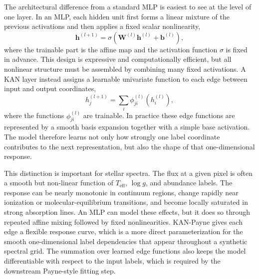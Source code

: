 \documentclass[universe,article,submit,pdftex,moreauthors]{Definitions/mdpi}
\begin{document}
The architectural difference from a standard MLP is easiest to see at the
level of one layer. In an MLP, each hidden unit first forms a linear mixture of
the previous activations and then applies a fixed scalar nonlinearity,
\begin{equation}
    \label{eq:mlp-layer}
    \mathbf{h}^{(l+1)} =
    \sigma\!\left(\mathbf{W}^{(l)}\mathbf{h}^{(l)}+\mathbf{b}^{(l)}\right),
\end{equation}
where the trainable part is the affine map and the activation function
$\sigma$ is fixed in advance. This design is expressive and computationally
efficient, but all nonlinear structure must be assembled by combining many
fixed activations. A KAN layer instead assigns a learnable univariate function
to each edge between input and output coordinates,
\begin{equation}
    \label{eq:kan-layer}
    h^{(l+1)}_j =
    \sum_i \phi^{(l)}_{j i}\!\left(h^{(l)}_i\right),
\end{equation}
where the functions $\phi^{(l)}_{ji}$ are trainable. In practice these edge
functions are represented by a smooth basis expansion together with a simple
base activation. The model therefore learns not only how strongly one label
coordinate contributes to the next representation, but also the shape of that
one-dimensional response.

This distinction is important for stellar spectra. The flux at a given pixel is
often a smooth but non-linear function of $T_{\mathrm{eff}}$, $\log g$, and
abundance labels. The response can be nearly monotonic in continuum regions,
change rapidly near ionization or molecular-equilibrium transitions, and become
locally saturated in strong absorption lines. An MLP can model these effects,
but it does so through repeated affine mixing followed by fixed nonlinearities.
KAN-Payne gives each edge a flexible response curve, which is a more direct
parameterization for the smooth one-dimensional label dependencies that appear
throughout a synthetic spectral grid. The summation over learned edge functions
also keeps the model differentiable with respect to the input labels, which is
required by the downstream Payne-style fitting step.
\end{document}
